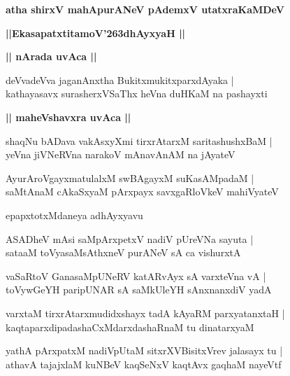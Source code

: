 \documentclass[twoside,12pt,openright]{book}
\def\S{\char'263}
\newcounter{shloka}[chapter]
\def\uvaca#1{\centerline{{\large\textbf{#1}}}}
\begin{document}
\begin{center}
{\LARGE\bfseries atha shirxV mahApurANeV pAdemxV utatxraKaMDeV}
\end{center}

\begin{center}
{\LARGE\bfseries ||EkasapatxtitamoV\S dhAyxyaH || }
\end{center}

\uvaca{|| nArada uvAca ||}

\begin{shloka}%
deVvadeVva jaganAnxtha BukitxmukitxparxdAyaka |\\
kathayasavx surasherxVSaThx heVna duHKaM na pashayxti
\end{shloka}

\uvaca{|| maheVshavxra uvAca ||}

\begin{shloka}%
shaqNu bADava vakAsxyXmi tirxrAtarxM saritashushxBaM |\\
yeVna jiVNeRVna narakoV mAnavAnAM na jAyateV 
\end{shloka}

\begin{shloka}%
AyurAroVgayxmatulalxM swBAgayxM suKasAMpadaM |\\
saMtAnaM cAkaSxyaM pArxpayx savxgaRloVkeV mahiVyateV 
\end{shloka}

\begin{center}
epapxtotxMdaneya adhAyxyavu
\end{center}

\begin{shloka}%
ASADheV mAsi saMpArxpetxV nadiV pUreVNa sayuta |\\
sataaM toVyasaMsAthxneV purANeV sA ca vishurxtA 
\end{shloka}

\begin{shloka}%
vaSaRtoV GanasaMpUNeRV katARvAyx sA varxteVna vA |\\
toVywGeYH paripUNAR sA saMkUleYH sAnxnanxdiV yadA 
\end{shloka}

\begin{shloka}%
varxtaM tirxrAtarxmudidxshayx tadA kAyaRM parxyatanxtaH |\\
kaqtaparxdipadashaCxMdarxdashaRnaM tu dinatarxyaM 
\end{shloka}

\begin{shloka}%
yathA pArxpatxM nadiVpUtaM sitxrXVBisitxVrev jalasayx tu |\\
athavA tajajxlaM kuNBeV kaqSeNxV kaqtAvx gaqhaM nayeVtf
\end{shloka}
\end{document}
